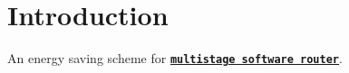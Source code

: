 \hypertarget{index_intro}{}\section{\-Introduction}\label{index_intro}
\-An energy saving scheme for \href{multistage_software_router.pdf}{\tt {\bfseries multistage software router}}. 